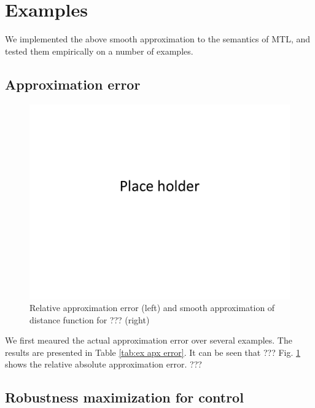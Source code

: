 \section{Examples}
\label{sec:examples}
We implemented the above smooth approximation to the semantics of MTL, and tested them empirically on a number of examples.

\subsection{Approximation error}
\label{sec: ex apx error}
\begin{figure}[t]
\centering
\includegraphics[width=0.7\linewidth]{figures/placeHolder}
\caption{Relative approximation error (left) and smooth approximation of distance function for ??? (right)}
\label{fig:sample result}
\end{figure}
We first meaured the actual approximation error over several examples.
The results are presented in Table \ref{tab:ex apx error}.
It can be seen that ???
Fig. \ref{fig:sample result} shows the relative absolute approximation error.
???

\subsection{Robustness maximization for control}
\label{sec:toy example}
